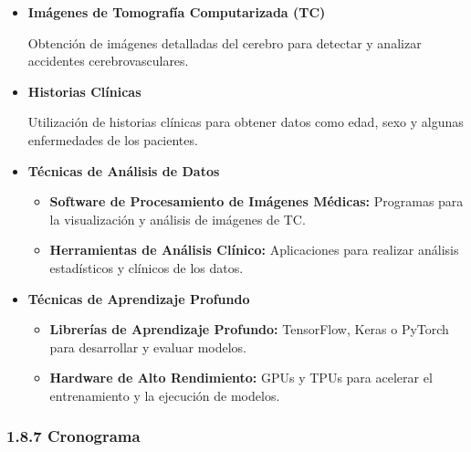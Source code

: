 \begin{itemize}
    \item \textbf{Imágenes de Tomografía Computarizada (TC)}
    \begin{itemize}
       Obtención de imágenes detalladas del cerebro para detectar y analizar accidentes cerebrovasculares.
    \end{itemize}
    
    \item \textbf{Historias Clínicas}
    \begin{itemize}
        Utilización de historias clínicas para obtener datos como edad, sexo y algunas enfermedades de los pacientes.
    \end{itemize}
    
    \item \textbf{Técnicas de Análisis de Datos}
    \begin{itemize}
        \item \textbf{Software de Procesamiento de Imágenes Médicas:} Programas para la visualización y análisis de imágenes de TC.
        \item \textbf{Herramientas de Análisis Clínico:} Aplicaciones para realizar análisis estadísticos y clínicos de los datos.
    \end{itemize}
    
    \item \textbf{Técnicas de Aprendizaje Profundo}
    \begin{itemize}
        \item \textbf{Librerías de Aprendizaje Profundo:} TensorFlow, Keras o PyTorch para desarrollar y evaluar modelos.
        \item \textbf{Hardware de Alto Rendimiento:} GPUs y TPUs para acelerar el entrenamiento y la ejecución de modelos.
    \end{itemize}
\end{itemize}


\subsubsection{1.8.7 Cronograma}


